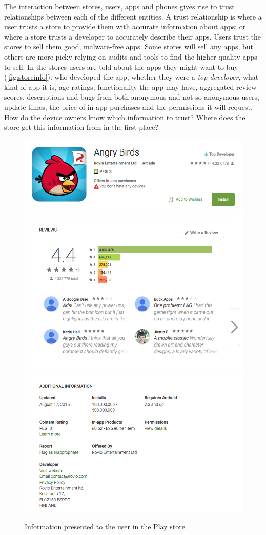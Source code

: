 \documentclass[a4paper]{scrartcl}
\begin{document}
The interaction between stores, users, apps and phones gives rise to trust relationships between each of the different entities.
A trust relationship is where a user trusts a store to provide them with accurate information about apps; or where a store trusts a developer to accurately describe their apps.
Users trust the stores to sell them good, malware-free apps.
Some stores will sell any apps, but others are more picky relying on audits and tools to find the higher quality apps to sell.
In the stores users are told about the apps they might want to buy (\autoref{fig:storeinfo}):
who developed the app, whether they were a \emph{top developer}, what kind of app it is, age ratings, functionality the app may have, aggregated review scores, descriptions and bugs from both anonymous and not so anonymous users, update times, the price of in-app-purchases and the permissions it will request.
How do the device owners know which information to trust?
Where does the store get this information from in the first place?

\begin{figure}\centering
  \includegraphics[width=0.8\linewidth]{images/angrybirds.png}
  \includegraphics[width=0.8\linewidth]{images/reviews.png}
  \includegraphics[width=0.8\linewidth]{images/additionalinfo.png}
  \caption{Information presented to the user in the Play store.}
  \label{fig:storeinfo}
\end{figure}
\end{document}
